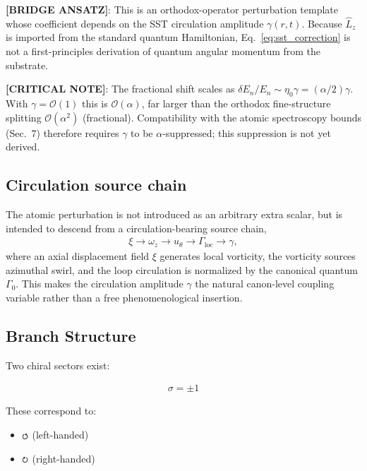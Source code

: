 \documentclass[11pt]{article}
\theoremstyle{definition}
\theoremstyle{plain}
\theoremstyle{remark}
\newcommand{\swirlarrow}{\mathchoice{\mkern-2mu\scriptstyle\boldsymbol{\circlearrowleft}}{\mkern-2mu\scriptstyle\boldsymbol{\circlearrowleft}}{\mkern-2mu\scriptscriptstyle\boldsymbol{\circlearrowleft}}{\mkern-2mu\scriptscriptstyle\boldsymbol{\circlearrowleft}}}
\newcommand{\swirlarrowcw}{\mathchoice{\mkern-2mu\scriptstyle\boldsymbol{\circlearrowright}}{\mkern-2mu\scriptstyle\boldsymbol{\circlearrowright}}{\mkern-2mu\scriptscriptstyle\boldsymbol{\circlearrowright}}{\mkern-2mu\scriptscriptstyle\boldsymbol{\circlearrowright}}}
\begin{document}
        \textbf{[BRIDGE ANSATZ]}: This is an orthodox-operator perturbation template whose coefficient depends on the SST circulation amplitude $\gamma(r,t)$. Because \(\hat L_z\) is imported from the standard quantum Hamiltonian, Eq.~\eqref{eq:sst_correction} is not a first-principles derivation of quantum angular momentum from the substrate.

        \textbf{[CRITICAL NOTE]}: The fractional shift scales as $\delta E_n/E_n \sim \eta_0\gamma=(\alpha/2)\gamma$. With $\gamma=\mathcal{O}(1)$ this is $\mathcal{O}(\alpha)$, far larger than the orthodox fine-structure splitting $\mathcal{O}(\alpha^2)$ (fractional). Compatibility with the atomic spectroscopy bounds (Sec.~7) therefore requires $\gamma$ to be $\alpha$-suppressed; this suppression is not yet derived.

    \subsection{Circulation source chain}
        The atomic perturbation is not introduced as an arbitrary extra scalar, but is intended to descend from a circulation-bearing source chain,
        \begin{align}
            \xi \rightarrow \omega_z \rightarrow u_\theta \rightarrow \Gamma_{\mathrm{loc}} \rightarrow \gamma,
        \end{align}
        where an axial displacement field $\xi$ generates local vorticity, the vorticity sources azimuthal swirl, and the loop circulation is normalized by the canonical quantum $\Gamma_0$. This makes the circulation amplitude $\gamma$ the natural canon-level coupling variable rather than a free phenomenological insertion.
    
    \subsection{Branch Structure}
        
        Two chiral sectors exist:
        
        \begin{align}
            \sigma = \pm 1
        \end{align}
        
        These correspond to:
        
        \begin{itemize}
            \item $\swirlarrow$ (left-handed)
            \item $\swirlarrowcw$ (right-handed)
        \end{itemize}
    
\end{document}
